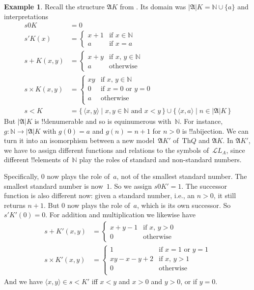\documentclass[10pt,a4paper]{article}
\makeatletter
\theoremstyle{plain}
\theoremstyle{definition}
\newtheorem{ex}[thm]{Example}
\theoremstyle{remark}
\newcommand*{\ollabel}[1]{\label{#1}}
\newcommand{\olref}{\@ifnextchar[{\olref@i}{\olref@final}}
\def\olref@i[#1]{\@ifnextchar[{\olref@ii}{\olref@final}}
\def\olref@ii[#1]{\@ifnextchar[{\olref@iii}{\olref@final}}
\def\olref@iii[#1]{\olref@final}
\def\olref@final#1{\ref{#1}}
\providecommand{\Obj}{}
\providecommand{\Struct}{\ensuremath{\mathfrak{A}}}
\providecommand{\Domain}{\ensuremath{|\mathfrak{A}|}}
\providecommand{\Assign}{\ensuremath{s}}
\providecommand{\Lang}{\ensuremath{\mathcal{L}}}
\providecommand{\Th}{\ensuremath{\mathrm{Th}}}
\providecommand{\tuple}[1]{\langle #1 \rangle}
\providecommand{\Nat}{\ensuremath{\mathbb{N}}}
\providecommand{\Setabs}[2]{\{\, #1 \mid #2 \,\}}
\makeatother
\begin{document}
\begin{ex}\ollabel{ex:comp-model-q}
Recall the structure $\Struct{K}$ from \olref[mdq]{ex:model-K-of-Q}.
Its domain was $\Domain{K} = \Nat
\cup \{a\}$ and interpretations
\begin{align*}
  \Assign{\Obj{0}}{K} & = 0\\
  \Assign{\prime}{K}(x) & =
  \begin{cases}
    x+1 & \text{if $x\in \Nat$}\\
    a & \text{if $x = a$}
  \end{cases}\\
  \Assign{+}{K}(x, y) & =
  \begin{cases}
    x+y & \text{if $x$, $y \in\Nat$}\\
    a & \text{otherwise}
  \end{cases}\\
  \Assign{\times}{K}(x, y) & =
  \begin{cases}
    xy & \text{if $x$, $y \in\Nat$}\\
    0 & \text{if $x=0$ or $y=0$}\\
    a & \text{otherwise}\\
  \end{cases}\\
  \Assign{<}{K} & =
  \Setabs{\tuple{x,y}}{x, y \in \Nat \text{ and } x<y} \cup
  \Setabs{\tuple{x,a}}{n \in \Domain{K}}
\end{align*}
But $\Domain{K}$ is !!{denumerable} and so is equinumerous
with~$\Nat$. For instance, $g\colon \Nat \to \Domain{K}$ with $g(0) =
a$ and $g(n) = n+1$ for $n>0$ is !!a{bijection}.  We can turn it into
an isomorphism between a new model~$\Struct{K'}$ of~$\Th{Q}$ and
$\Struct{K}$.  In $\Struct{K'}$, we have to assign different functions
and relations to the symbols of~$\Lang{L_A}$, since different
!!{element}s of~$\Nat$ play the roles of standard and non-standard
numbers.

Specifically, $0$ now plays the role of~$a$, not of the smallest
standard number. The smallest standard number is now~$1$. So we assign
$\Assign{\Obj{0}}{K'} = 1$. The successor function is also different
now: given a standard number, i.e., an $n > 0$, it still returns
$n+1$. But $0$ now plays the role of~$a$, which is its own
successor. So $\Assign{\prime}{K'}(0) = 0$.  For addition and
multiplication we likewise have
\begin{align*}
\Assign{+}{K'}(x, y) & =
  \begin{cases}
    x+y-1 & \text{if $x$, $y >0$}\\
    0 & \text{otherwise}
  \end{cases}\\
  \Assign{\times}{K'}(x, y) & =
  \begin{cases}
    1 & \text{if $x = 1$ or $y = 1$}\\
    xy - x - y + 2 & \text{if $x$, $y > 1$}\\
    0 & \text{otherwise}\\
  \end{cases}
\end{align*}
And we have $\tuple{x, y} \in \Assign{<}{K'}$ iff $x < y$ and $x > 0$
and $y > 0$, or if $y = 0$.


\end{ex}
\end{document}
